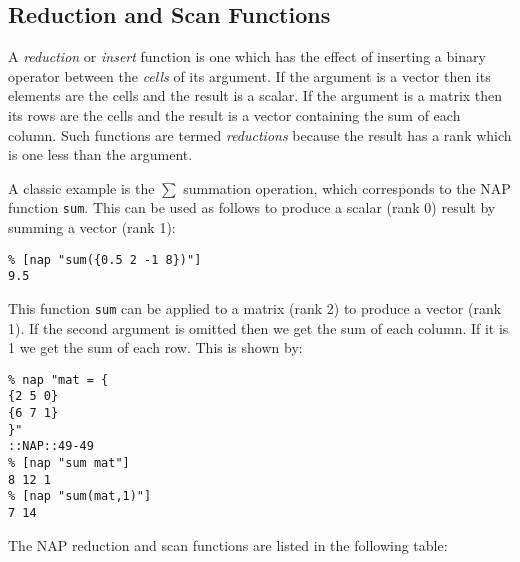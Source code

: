   \subsection{
    \label{Reduction}Reduction and Scan Functions
  }

  \par A 
  \textit{reduction} or 
  \textit{insert} function is one which has the effect of inserting a
  binary operator between the 
  \textit{cells} of its argument. If the argument is a vector then its
  elements are the cells and the result is a scalar. If the argument is
  a matrix then its rows are the cells and the result is a vector
  containing the sum of each column. Such functions are termed 
  \textit{reductions} because the result has a rank which is one less
  than the argument.
  \par A classic example is the $\sum$ summation operation, which
  corresponds to the NAP function 
  \texttt{sum}. This can be used as follows to produce a scalar
  (rank 0) result by summing a vector (rank 1):
  \begin{verbatim}
% [nap "sum({0.5 2 -1 8})"]
9.5
\end{verbatim}

This function 
  \texttt{sum} can be applied to a matrix (rank 2) to produce a
  vector (rank 1). If the second argument is omitted then we get the
  sum of each column. If it is 1 we get the sum of each row. This is
  shown by:
  \begin{verbatim}
% nap "mat = {
{2 5 0}
{6 7 1}
}"
::NAP::49-49
% [nap "sum mat"]
8 12 1
% [nap "sum(mat,1)"]
7 14
\end{verbatim}

  \par The NAP reduction and scan functions are listed in the following
  table:

